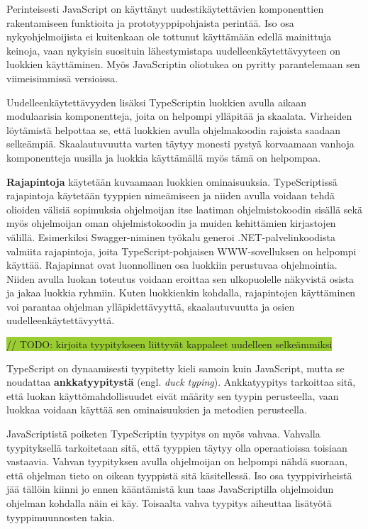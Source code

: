 \documentclass[utf8]{gradu3}
\begin{document}
Perinteisesti JavaScript on käyttänyt uudestikäytettävien komponenttien rakentamiseen funktioita ja prototyyppipohjaista perintää. Iso osa nykyohjelmoijista ei kuitenkaan ole tottunut käyttämään edellä mainittuja keinoja, vaan nykyisin suosituin lähestymistapa uudelleenkäytettävyyteen on luokkien käyttäminen. Myös JavaScriptin oliotukea on pyritty parantelemaan sen viimeisimmissä versioissa. \parencite[]{typescript-classes}

Uudelleenkäytettävyyden lisäksi TypeScriptin luokkien avulla aikaan modulaarisia komponentteja, joita on helpompi ylläpitää ja skaalata. Virheiden löytämistä helpottaa se, että luokkien avulla ohjelmakoodin rajoista saadaan selkeämpiä. Skaalautuvuutta varten täytyy monesti pystyä korvaamaan vanhoja komponentteja uusilla ja luokkia käyttämällä myös tämä on helpompaa.

\textbf{Rajapintoja} käytetään kuvaamaan luokkien ominaisuuksia. TypeScriptissä rajapintoja käytetään tyyppien nimeämiseen ja niiden avulla voidaan tehdä olioiden välisiä sopimuksia ohjelmoijan itse laatiman ohjelmistokoodin sisällä sekä myös ohjelmoijan oman ohjelmistokoodin ja muiden kehittämien kirjastojen välillä. \parencite[]{typescript-interfaces} Esimerkiksi Swagger-niminen työkalu generoi .NET-palvelinkoodista valmiita rajapintoja, joita TypeScript-pohjaisen WWW-sovelluksen on helpompi käyttää. Rajapinnat ovat luonnollinen osa luokkiin perustuvaa ohjelmointia. Niiden avulla luokan toteutus voidaan eroittaa sen ulkopuolelle näkyvistä osista ja jakaa luokkia ryhmiin. Kuten luokkienkin kohdalla, rajapintojen käyttäminen voi parantaa ohjelman ylläpidettävyyttä, skaalautuvuutta ja osien uudelleenkäytettävyyttä.

\colorbox{YellowGreen}{// TODO: kirjoita tyypitykseen liittyvät kappaleet uudelleen selkeämmiksi}

TypeScript on dynaamisesti tyypitetty kieli samoin kuin JavaScript, mutta se noudattaa \textbf{ankkatyypitystä} (engl. \textit{duck typing}). Ankkatyypitys tarkoittaa sitä, että luokan käyttömahdollisuudet eivät määrity sen tyypin perusteella, vaan luokkaa voidaan käyttää sen ominaisuuksien ja metodien perusteella.

JavaScriptistä poiketen TypeScriptin tyypitys on myös vahvaa. Vahvalla tyypityksellä tarkoitetaan sitä, että tyyppien täytyy olla operaatioissa toisiaan vastaavia. Vahvan tyypityksen avulla ohjelmoijan on helpompi nähdä suoraan, että ohjelman tieto on oikean tyyppistä sitä käsitellessä. Iso osa tyyppivirheistä jää tällöin kiinni jo ennen kääntämistä kun taas JavaScriptilla ohjelmoidun ohjelman kohdalla näin ei käy. Toisaalta vahva tyypitys aiheuttaa lisätyötä tyyppimuunnosten takia.
\end{document}
